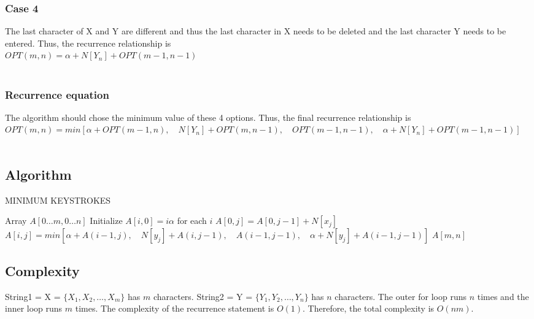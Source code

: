 \documentclass{article}
\theoremstyle{definition}
\theoremstyle{remark}
\theoremstyle{plain}
\begin{document}
\subsubsection*{Case 4}
The last character of X and Y are different and thus the last character in X needs to be deleted and the last character Y needs to be entered.  Thus, the recurrence relationship is\\
$OPT(m,n) = \alpha + N[Y_n] + OPT(m-1,n-1)$\\\\
\subsubsection*{Recurrence equation}
The algorithm should chose the minimum value of these 4 options.  Thus, the final recurrence relationship is\\
$OPT(m,n) = min[ \alpha + OPT(m-1,n) ,\quad   N[Y_n] + OPT(m,n-1) ,\quad OPT(m-1,n-1)  ,\quad  \alpha + N[Y_n] + OPT(m-1,n-1) ]$\\\\

\subsection*{Algorithm}

\begin{algorithm}
\caption{MINIMUM KEYSTROKES}\label{Find the minimum number of keystrokes needed to change string1 to string2}
\begin{algorithmic}[1]
 
        \State Array $A[0\ldots m, 0 \ldots n]$
        \State Initialize $A[i, 0]  = i\alpha$ for each $i$
         	\State $A[0,j] = A[0,j-1] + N[x_j]$
        \EndFor
			\State $A[i,j] = min[\alpha + A(i-1,j)  , \quad  N[y_j] + A(i,j-1) , \quad  A(i-1,j-1), \quad \alpha + N[y_j] +  A(i-1,j-1) ]$ 
		\EndFor
	\EndFor
	\State \Return $A[m,n]$
\EndProcedure

\end{algorithmic}
\end{algorithm}

\subsection*{Complexity}
String1 = X = $\{X_1, X_2, \ldots, X_m\}$ has $m$ characters. String2 = Y = $\{Y_1, Y_2, \ldots, Y_n\}$ has $n$ characters. The outer for loop runs $n$ times and the inner loop runs $m$ times. The complexity of the recurrence statement is $O(1)$. Therefore, the total complexity is $O(nm)$.
\end{document}
